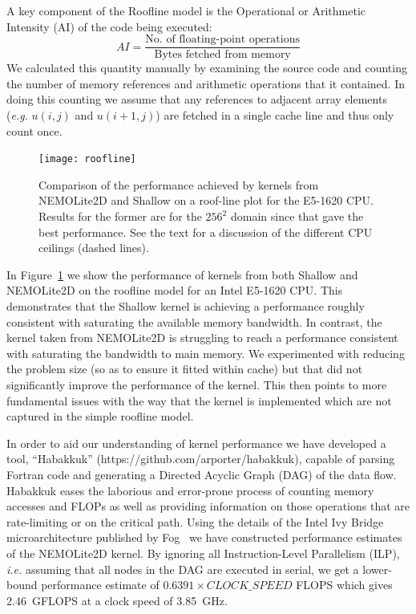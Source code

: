 \documentclass[gmdd, manuscript]{copernicus}
\begin{document}
A key component of the Roofline model is the Operational or Arithmetic
Intensity (AI) of the code being executed:
\[
AI = \frac{\textrm{No. of floating-point operations}}{\textrm{Bytes fetched from memory}}
\]
We calculated this quantity manually by examining the
source code and counting the number of memory references and
arithmetic operations that it contained. In doing this counting we
assume that any references to adjacent array elements (\textit{e.g.}
$u(i,j)$ and $u(i+1,j)$) are fetched in a single cache line and thus
only count once.

\begin{figure}
\centering
\texttt{[image: roofline]}
\caption{Comparison of the performance achieved by kernels from
  NEMOLite2D and Shallow on a roof-line plot for the E5-1620
  CPU. Results for the former are for the $256^2$ domain since that
  gave the best performance. See the text for a discussion of the
  different CPU ceilings (dashed lines).}
\label{FIG_roofline}
\end{figure}

In Figure~\ref{FIG_roofline} we show the performance of kernels from
both Shallow and NEMOLite2D on the roofline model for an Intel E5-1620 CPU.
This demonstrates that the Shallow kernel is achieving a performance
roughly consistent with saturating the available memory bandwidth. In
contrast, the kernel taken from NEMOLite2D is struggling to reach a
performance consistent with saturating the bandwidth to main
memory. We experimented with reducing the problem size (so as to
ensure it fitted within cache) but that did not significantly improve
the performance of the kernel. This then points to more fundamental issues
with the way that the kernel is implemented which are not captured in the
simple roofline model.

In order to aid our understanding of kernel performance we have
developed a tool, ``Habakkuk'' (https://github.com/arporter/habakkuk),
capable of parsing Fortran code and generating a Directed Acyclic
Graph (DAG) of the data flow. Habakkuk eases the laborious and
error-prone process of counting memory accesses and FLOPs as well as
providing information on those operations that are rate-limiting or on
the critical path. Using the details of the Intel Ivy Bridge
microarchitecture published by Fog~\citep{fog_microarch,
  fog_instructions} we have constructed performance estimates of the
NEMOLite2D kernel. By ignoring all Instruction-Level Parallelism
(ILP), \textit{i.e.} assuming that all nodes in the DAG are executed
in serial, we get a lower-bound performance estimate of $0.6391 \times
CLOCK\_SPEED$ FLOPS which gives 2.46~GFLOPS at a clock speed of
3.85~GHz.
\end{document}
